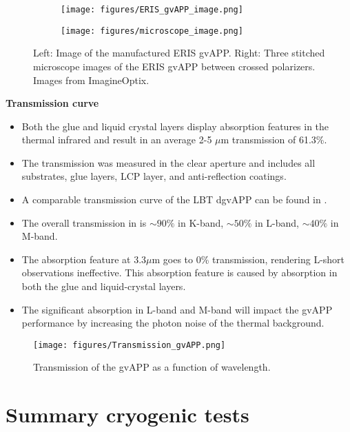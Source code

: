 \documentclass{aa}
\begin{document}
\begin{figure}
\centering
\begin{subfigure}{.25\textwidth}
  \centering
    \texttt{[image: figures/ERIS\_gvAPP\_image.png]}
\end{subfigure}%
\begin{subfigure}{.25\textwidth}
  \centering
    \texttt{[image: figures/microscope\_image.png]}
  \label{fig:microscope_image}
  \label{fig:sub2}
\end{subfigure}
    \caption{Left: Image of the manufactured ERIS gvAPP. Right: Three stitched microscope images of the ERIS gvAPP between crossed polarizers. Images from ImagineOptix. }
\label{fig:test}
\end{figure}

\textbf{Transmission curve}
\begin{itemize}
    \item Both the glue and liquid crystal layers display absorption features in the thermal infrared and result in an average 2-5 $\mu$m transmission of 61.3\%. 
    \item The transmission was measured in the clear aperture and includes all substrates, glue layers, LCP layer, and anti-reflection coatings.
    \item A comparable transmission curve of the LBT dgvAPP can be found in \cite{2022AJ....163..217D}. 
    \item The overall transmission in is $\sim 90\%$ in K-band, $\sim 50\%$ in L-band, $\sim 40\%$ in M-band. 
    \item The absorption feature at $3.3 \mu$m goes to 0\% transmission, rendering L-short observations ineffective. This absorption feature is caused by absorption in both the glue and liquid-crystal layers.
    \item The significant absorption in L-band and M-band will impact the gvAPP performance by increasing the photon noise of the thermal background.
\end{itemize}

\begin{figure}
    \centering
    \texttt{[image: figures/Transmission\_gvAPP.png]}
    \caption{Transmission of the gvAPP as a function of wavelength. }
    \label{fig:optical_layering}
\end{figure}

\section{Summary cryogenic tests}
\end{document}
